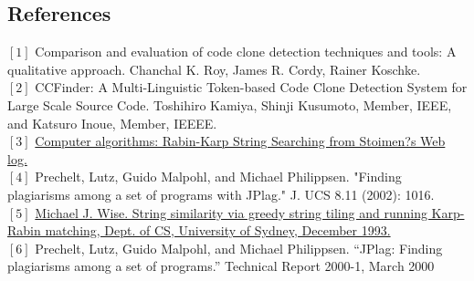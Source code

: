 \subsection{References}
$[1]$ Comparison and evaluation of code clone detection techniques and tools: A qualitative approach. Chanchal K. Roy, James R. Cordy, Rainer Koschke.\\
$[2]$ CCFinder: A Multi-Linguistic Token-based Code Clone Detection System for Large Scale Source Code. Toshihiro Kamiya, Shinji Kusumoto, Member, IEEE, and Katsuro Inoue, Member, IEEEE.\\
$[3]$ \href{http://www.stoimen.com/blog/2012/04/02/computer-algorithms-rabin-karp-string-searching/}{Computer algorithms: Rabin-Karp String Searching from Stoimen?s Web log.}\\
$[4]$ Prechelt, Lutz, Guido Malpohl, and Michael Philippsen. "Finding plagiarisms among a set of programs with JPlag." J. UCS 8.11 (2002): 1016.\\
$[5]$ \href{ftp://ftp.cs.su.oz.au/michaelw/doc/RKR GST.ps}{Michael J. Wise. String similarity via greedy string tiling and running Karp-Rabin matching, Dept. of CS, University of Sydney, December 1993.}\\
$[6]$ Prechelt, Lutz, Guido Malpohl, and Michael Philippsen. “JPlag: Finding plagiarisms among a set of programs.” Technical Report 2000-1, March 2000\\

